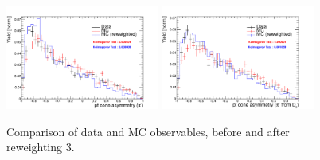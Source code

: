 \begin{figure}[h!]
\includegraphics[height=6.cm,width=0.45\textwidth]{figs/MC-v-Data/pi_minus_ptasy_1_00.pdf}
\includegraphics[height=6.cm,width=0.45\textwidth]{figs/MC-v-Data/pi_minus_fromDs_ptasy_1_00.pdf}
\caption{Comparison of data and MC observables, before and after reweighting 3.}
\end{figure}










\FloatBarrier
